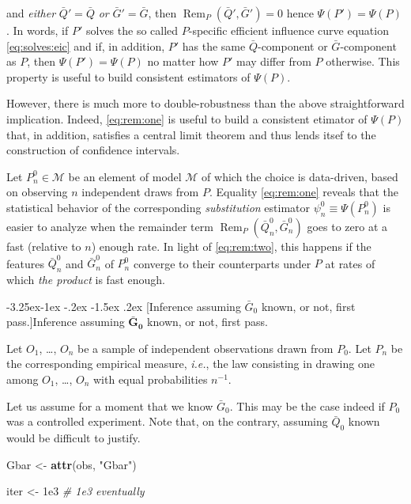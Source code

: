 \documentclass[]{article}
\makeatletter
\newenvironment{Shaded}{\begin{snugshade}}{\end{snugshade}}
\newcommand{\CommentTok}[1]{\textcolor[rgb]{0.56,0.35,0.01}{\textit{#1}}}
\newcommand{\FloatTok}[1]{\textcolor[rgb]{0.00,0.00,0.81}{#1}}
\newcommand{\KeywordTok}[1]{\textcolor[rgb]{0.13,0.29,0.53}{\textbf{#1}}}
\newcommand{\NormalTok}[1]{#1}
\newcommand{\StringTok}[1]{\textcolor[rgb]{0.31,0.60,0.02}{#1}}
\renewcommand\subsection{\@startsection{subsection}{3}{\z@}%
                                     {-3.25ex\@plus -1ex \@minus -.2ex}%
                                     {-1.5ex \@plus .2ex}%
                                     {\normalfont\normalsize\bfseries}}
\DeclareMathOperator{\Rem}{Rem}
\newcommand{\calM}{\mathcal{M}}
\newcommand{\Gbar}{\bar{G}}
\newcommand{\Qbar}{\bar{Q}}
\theoremstyle{definition}
\theoremstyle{definition}
\theoremstyle{definition}
\theoremstyle{remark}
\makeatother
\begin{document}
and \textit{either} \(\Qbar' = \Qbar\) \textit{or} \(\Gbar' = \Gbar\),
then \(\Rem_{P} (\Qbar', \Gbar') = 0\) hence \(\Psi(P') = \Psi(P)\). In
words, if \(P'\) solves the so called \(P\)-specific efficient influence
curve equation \eqref{eq:solves:eic} and if, in addition, \(P'\) has the
same \(\Qbar\)-component or \(\Gbar\)-component as \(P\), then
\(\Psi(P') = \Psi(P)\) no matter how \(P'\) may differ from \(P\)
otherwise. This property is useful to build consistent estimators of
\(\Psi(P)\).

However, there is much more to double-robustness than the above
straightforward implication. Indeed, \ref{eq:rem:one} is useful to build
a consistent etimator of \(\Psi(P)\) that, in addition, satisfies a
central limit theorem and thus lends itsef to the construction of
confidence intervals.

Let \(P_{n}^{0} \in \calM\) be an element of model \(\calM\) of which
the choice is data-driven, based on observing \(n\) independent draws
from \(P\). Equality \ref{eq:rem:one} reveals that the statistical
behavior of the corresponding \textit{substitution} estimator
\(\psi_{n}^{0} \equiv \Psi(P_{n}^{0})\) is easier to analyze when the
remainder term \(\Rem_{P} (\Qbar_{n}^{0}, \Gbar_{n}^{0})\) goes to zero
at a fast (relative to \(n\)) enough rate. In light of \ref{eq:rem:two},
this happens if the features \(\Qbar_{n}^{0}\) and \(\Gbar_{n}^{0}\) of
\(P_{n}^{0}\) converge to their counterparts under \(P\) at rates of
which \textit{the product} is fast enough.

\subsection[Inference assuming $\Gbar_{0}$ known, or not, first pass.]{Inference assuming
$\boldsymbol{\Gbar_{0}}$ known, or not, first pass.} 
\label{subsec:known:gbar:one}

Let \(O_{1}\), \ldots, \(O_{n}\) be a sample of independent observations
drawn from \(P_{0}\). Let \(P_{n}\) be the corresponding empirical
measure, \textit{i.e.}, the law consisting in drawing one among
\(O_{1}\), \ldots, \(O_{n}\) with equal probabilities \(n^{-1}\).

Let us assume for a moment that we know \(\Gbar_{0}\). This may be the
case indeed if \(P_{0}\) was a controlled experiment. Note that, on the
contrary, assuming \(\Qbar_{0}\) known would be difficult to justify.

\begin{Shaded}
\begin{Highlighting}[]
\NormalTok{Gbar <-}\StringTok{ }\KeywordTok{attr}\NormalTok{(obs, }\StringTok{"Gbar"}\NormalTok{)}

\NormalTok{iter <-}\StringTok{ }\FloatTok{1e3} \CommentTok{# 1e3 eventually}
\end{Highlighting}
\end{Shaded}
\end{document}
